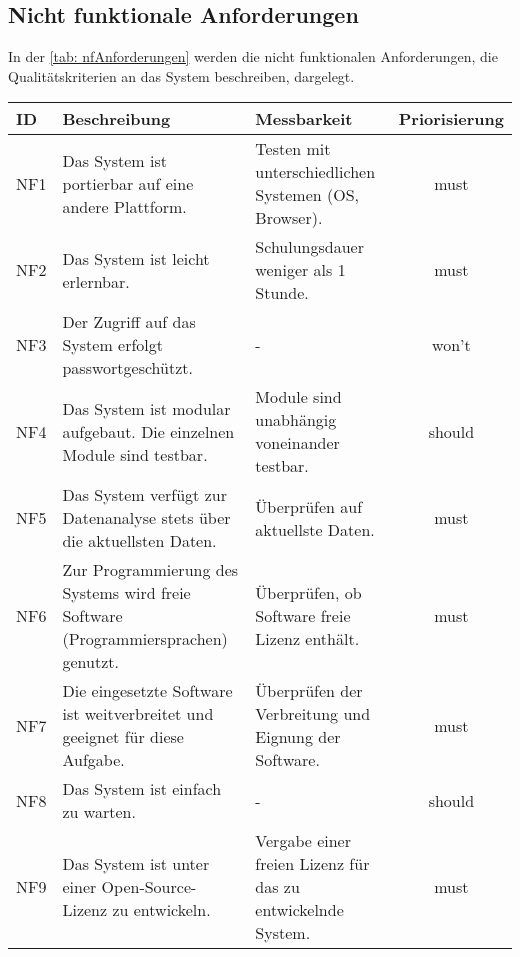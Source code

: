 \subsection{Nicht funktionale Anforderungen}
In der \autoref{tab: nfAnforderungen} werden die nicht funktionalen Anforderungen, die Qualitätskriterien an das System
beschreiben, dargelegt.
\begingroup
\setlength{\tabcolsep}{9pt} %
\renewcommand{\arraystretch}{1.0} 
\begin{table}[H]
    \centering
    \begin{adjustbox}{max width=\textwidth}
    \begin{tabular}{lp{7.5cm}p{7.5cm}c}
       \toprule
       \textbf{ID}          & \textbf{Beschreibung} & \textbf{Messbarkeit} & \textbf{Priorisierung}\\
       \midrule
        NF1                               &Das System ist portierbar auf eine andere Plattform. & Testen mit unterschiedlichen Systemen (OS, Browser). & must\\
        NF2                               &Das System ist leicht erlernbar.& Schulungsdauer weniger als 1 Stunde.  & must\\
        NF3                               &Der Zugriff auf das System erfolgt passwortgeschützt. & -  & won't\\
        NF4                               &Das System ist modular aufgebaut. Die einzelnen Module sind testbar. & Module sind unabhängig voneinander testbar. & should\\
        NF5                               &Das System verfügt zur Datenanalyse stets über die aktuellsten Daten. & Überprüfen auf aktuellste Daten. & must\\
        NF6                               &Zur Programmierung des Systems wird freie Software (Programmiersprachen) genutzt. & Überprüfen, ob Software freie Lizenz enthält.  & must\\
        NF7                               &Die eingesetzte Software ist weitverbreitet und geeignet für diese Aufgabe. & Überprüfen der Verbreitung und Eignung der Software. & must\\
        NF8                               &Das System ist einfach zu warten. & - & should\\
        NF9                               &Das System ist unter einer Open-Source-Lizenz zu entwickeln. & Vergabe einer freien Lizenz für das zu entwickelnde System.  & must\\

\end{tabular}
\end{adjustbox}
\end{table}
